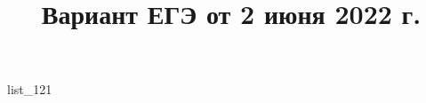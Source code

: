 \documentclass[12pt, a4paper]{article}
\begin{document}
	\title{Вариант ЕГЭ от 2 июня 2022 г.}
	{list_121}
\end{document}
